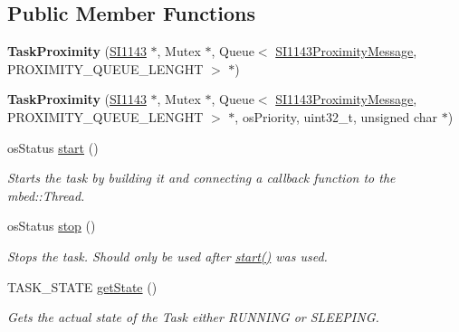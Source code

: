 \subsection*{Public Member Functions}
\begin{DoxyCompactItemize}
\item 
\hypertarget{class_task_proximity_a2e178fef32356fece189e2a3d5e51ed8}{}{\bfseries Task\+Proximity} (\hyperlink{class_s_i1143}{S\+I1143} $\ast$, Mutex $\ast$, Queue$<$ \hyperlink{class_s_i1143_proximity_message}{S\+I1143\+Proximity\+Message}, P\+R\+O\+X\+I\+M\+I\+T\+Y\+\_\+\+Q\+U\+E\+U\+E\+\_\+\+L\+E\+N\+G\+H\+T $>$ $\ast$)\label{class_task_proximity_a2e178fef32356fece189e2a3d5e51ed8}

\item 
\hypertarget{class_task_proximity_a177f14bdf30cfd34a5537a0b5e758e58}{}{\bfseries Task\+Proximity} (\hyperlink{class_s_i1143}{S\+I1143} $\ast$, Mutex $\ast$, Queue$<$ \hyperlink{class_s_i1143_proximity_message}{S\+I1143\+Proximity\+Message}, P\+R\+O\+X\+I\+M\+I\+T\+Y\+\_\+\+Q\+U\+E\+U\+E\+\_\+\+L\+E\+N\+G\+H\+T $>$ $\ast$, os\+Priority, uint32\+\_\+t, unsigned char $\ast$)\label{class_task_proximity_a177f14bdf30cfd34a5537a0b5e758e58}

\item 
os\+Status \hyperlink{class_task_proximity_a38eee2752705735bd33b621ea7bcca8b}{start} ()
\begin{DoxyCompactList}\small\item\em Starts the task by building it and connecting a callback function to the mbed\+::\+Thread. \end{DoxyCompactList}\item 
os\+Status \hyperlink{class_task_proximity_a6838a84e0bd2d236f09f6344263ae3b9}{stop} ()
\begin{DoxyCompactList}\small\item\em Stops the task. Should only be used after \hyperlink{class_task_proximity_a38eee2752705735bd33b621ea7bcca8b}{start()} was used. \end{DoxyCompactList}\item 
T\+A\+S\+K\+\_\+\+S\+T\+A\+T\+E \hyperlink{class_task_proximity_a71f0b1482f40f70f3405594d27ff9c8c}{get\+State} ()
\begin{DoxyCompactList}\small\item\em Gets the actual state of the Task either R\+U\+N\+N\+I\+N\+G or S\+L\+E\+E\+P\+I\+N\+G. \end{DoxyCompactList}\end{DoxyCompactItemize}


